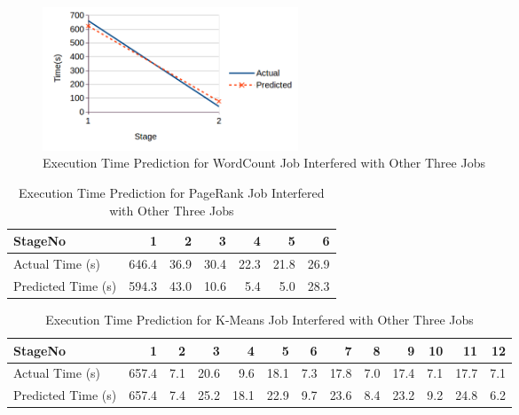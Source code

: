 {\begin{figure}[!t]
\label{lr20gprkmwc}
\end{figure}
\begin{figure}[!t]
\centering
\captionsetup{justification=centering}
\includegraphics[width=3in]{wc20g_pr_km_lr.png}
\caption{Execution Time Prediction for WordCount Job Interfered with Other Three Jobs}
\label{wc20gprkmlr}
\end{figure}

}

\begin{table}[!htb]
\renewcommand{\arraystretch}{1.3}
\caption{Execution Time Prediction for PageRank Job Interfered with Other Three Jobs}
\label{pr20gkmlrwc}
\centering
\begin{tabular}{l|r|r|r|r|r|r}
\hline
\bfseries StageNo & \bfseries 1 & \bfseries 2 & \bfseries 3 & \bfseries 4 & \bfseries 5 & \bfseries 6 \\
\hline \hline
Actual Time (s)
&646.4
&36.9
&30.4
&22.3
&21.8
&26.9 \\
\hline
Predicted Time (s) 
&594.3
&43.0
&10.6
&5.4
&5.0
&28.3 \\
\hline
\end{tabular}
\end{table}

\begin{table}[!htb]
\renewcommand{\arraystretch}{1.3}
\caption{Execution Time Prediction for K-Means Job Interfered with Other Three Jobs}
\label{km20gprlrwc}
\centering
\begin{tabular}{l|r|r|r|r|r|r|r|r|r|r|r|r}
\hline
\bfseries StageNo & \bfseries 1 & \bfseries 2 & \bfseries 3 & \bfseries 4 & \bfseries 5 & \bfseries 6 & \bfseries 7 & \bfseries 8 & \bfseries 9 & \bfseries 10 & \bfseries 11 & \bfseries 12\\
\hline \hline
Actual Time (s)
&657.4
&7.1
&20.6
&9.6
&18.1
&7.3
&17.8
&7.0
&17.4
&7.1
&17.7
&7.1 \\
\hline
Predicted Time (s) 
&657.4
&7.4
&25.2
&18.1
&22.9
&9.7
&23.6
&8.4
&23.2
&9.2
&24.8
&6.2 \\
\hline
\end{tabular}
\end{table}

